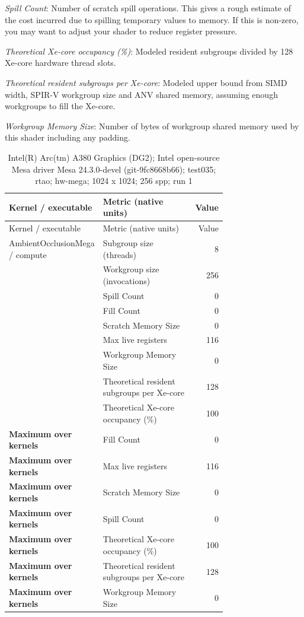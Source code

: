 \noindent\textit{Spill Count}: Number of scratch spill operations.  This gives a rough estimate of the cost incurred due to spilling temporary values to memory.  If this is non-zero, you may want to adjust your shader to reduce register pressure.\par
\noindent\textit{Theoretical Xe-core occupancy (\%)}: Modeled resident subgroups divided by 128 Xe-core hardware thread slots.\par
\noindent\textit{Theoretical resident subgroups per Xe-core}: Modeled upper bound from SIMD width, SPIR-V workgroup size and ANV shared memory, assuming enough workgroups to fill the Xe-core.\par
\noindent\textit{Workgroup Memory Size}: Number of bytes of workgroup shared memory used by this shader including any padding.\par
\begin{longtable}{p{0.30\linewidth}p{0.43\linewidth}r}
\caption{Intel(R) Arc(tm) A380 Graphics (DG2); Intel open-source Mesa driver Mesa 24.3.0-devel (git-9fc8668b66); test035; rtao; hw-mega; 1024 x 1024; 256 spp; run 1}\label{tab:hydra-profile-6}\\
\hline Kernel / executable & Metric (native units) & Value \\\hline
\endfirsthead
\hline Kernel / executable & Metric (native units) & Value \\\hline
\endhead
AmbientOcclusionMega / compute & Subgroup size (threads) & 8 \\
 & Workgroup size (invocations) & 256 \\
 & Spill Count & 0 \\
 & Fill Count & 0 \\
 & Scratch Memory Size & 0 \\
 & Max live registers & 116 \\
 & Workgroup Memory Size & 0 \\
 & Theoretical resident subgroups per Xe-core & 128 \\
 & Theoretical Xe-core occupancy (\%) & 100 \\
\hline
\textbf{Maximum over kernels} & Fill Count & 0 \\
\textbf{Maximum over kernels} & Max live registers & 116 \\
\textbf{Maximum over kernels} & Scratch Memory Size & 0 \\
\textbf{Maximum over kernels} & Spill Count & 0 \\
\textbf{Maximum over kernels} & Theoretical Xe-core occupancy (\%) & 100 \\
\textbf{Maximum over kernels} & Theoretical resident subgroups per Xe-core & 128 \\
\textbf{Maximum over kernels} & Workgroup Memory Size & 0 \\
\hline
\end{longtable}

